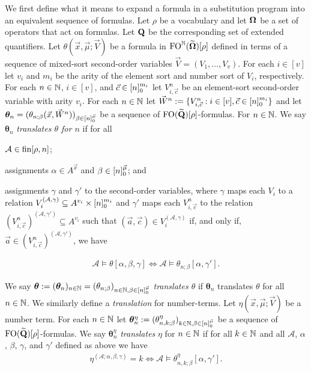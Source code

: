 \documentclass[../main/thesis.tex]{subfiles}
\begin{document}
We first define what it means to expand a formula in a substitution program into
an equivalent sequence of formulas. Let $\rho$ be a vocabulary and let $\mathbf{\mathbf{\Omega}}$
be a set of operators that act on formulas. Let $\mathbf{Q}$ be the corresponding
set of extended quantifiers. Let $\theta (\vec{x}, \vec{\mu}; \vec{V})$ be a
formula in $\text{\upshape FO}^{\mathbb{N}} (\widetilde{\mathbf{\mathbf{\Omega}}})[\rho]$ defined in terms of a sequence
of mixed-sort second-order variables $\vec{V} = (V_1, \ldots, V_v)$. For each $i
\in [v]$ let $v_i$ and $m_i$ be the arity of the element sort and number sort of
$V_i$, respectively. For each $n \in \mathbb{N}$, $i \in [v]$, and $\vec{c} \in
[n]^{m_i}_0$ let $V^n_{i, \vec{c}}$ be an element-sort second-order
variable with arity $v_i$. For each $n \in \mathbb{N}$ let $\vec{W}^n := \{ V^n_{i,
  \vec{c}} : i \in [v], \vec{c} \in [n]^{m_i}_0\}$ and let
$\boldsymbol{\theta}_n = (\theta_{n; \beta}(\vec{x}, \vec{W}^n))_{ \beta \in
  [n]^{\vec{\mu}}_0}$ be a sequence of
$\text{\upshape FO} (\widetilde{\mathbf{Q}})[\rho]$-formulas. For $n \in \mathbb{N}$. We say
$\boldsymbol{\theta}_n$ \emph{translates $\theta$ for $n$} if for all
\begin{myenum}
\item $\mathcal{A} \in \text{\upshape fin}{[\rho, n]}$;
\item assignments $\alpha \in A^{\vec{x}}$ and $\beta \in
  [n]^{\vec{\mu}}_0$; and
\item \label{obj:trans-con-SO}assignments $\gamma$ and $\gamma'$ to the
  second-order variables, where $\gamma$ maps each $V_i$ to a relation
  $V^{(\mathcal{A}, \gamma)}_i \subseteq A^{v_i} \times [n]^{m_i}_0$ and
  $\gamma'$ maps each $V^n_{i, \vec{c}}$ to the relation $(V^{n}_{i,
    \vec{c}})^{(\mathcal{A}, \gamma')} \subseteq A^{v_i}$ such that $(\vec{a},
  \vec{c}) \in V^{(\mathcal{A}, \gamma)}_{i}$ if, and only if, $\vec{a} \in
  (V^{n}_{i, \vec{c}})^{(\mathcal{A}, \gamma')}$, we have
\end{myenum}
\vspace{-2.8mm}
\begin{align*}
  \mathcal{A} \models \theta [\alpha , \beta, \gamma]  \iff \mathcal{A} \models \theta_{n;\beta} [\alpha, \gamma'].
\end{align*}

We say $\boldsymbol{\theta} := (\boldsymbol{\theta}_{n})_{n \in \mathbb{N}} =
(\theta_{n; \beta})_{n \in \mathbb{N}, \beta \in [n]^{\vec{\mu}}_0}$
\emph{translates $\theta$} if $\boldsymbol{\theta}_n$ translates $\theta$ for
all $n \in \mathbb{N}$. We similarly define a \emph{translation} for number-terms.
Let $\eta(\vec{x}, \vec{\mu}; \vec{V})$ be a number term. For each $n \in \mathbb{N}$
let $\boldsymbol{\theta}^{\eta}_n := (\theta^\eta_{n, k; \beta})_{k \in \mathbb{N},
  \beta \in [n]^{\vec{\mu}}_0}$ be a sequence of
$\text{\upshape FO} (\widetilde{\mathbf{Q}})[\rho]$-formulas. We say $\boldsymbol{\theta}^{\eta}_n$
\emph{translates} $\eta$ for $n \in \mathbb{N}$ if for all $k \in \mathbb{N}$ and all
$\mathcal{A}$, $\alpha$, $\beta$, $\gamma$, and $\gamma'$ defined as above we
have
\begin{align*}
  \eta^{(\mathcal{A}; \alpha, \beta, \gamma)} = k \iff \mathcal{A} \models \theta^{\eta}_{n, k; \beta}[\alpha, \gamma'].
\end{align*}
\end{document}
